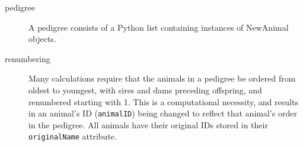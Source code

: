 \begin{description}
\item[pedigree] A \PYPEDAL{} pedigree consists of a Python list containing instances of \PYPEDAL{} NewAnimal{} objects.
\end{description}
\begin{description}
\item[renumbering] Many calculations require that the animals in a pedigree be ordered from oldest to youngest, with sires and dams preceding offspring, and renumbered  starting with 1.  This is a computational necessity, and results in an animal's ID (\texttt{animalID}) being changed to reflect that animal's order in the pedigree.  All animals have their original IDs stored in their \texttt{originalName} attribute.
\end{description}
